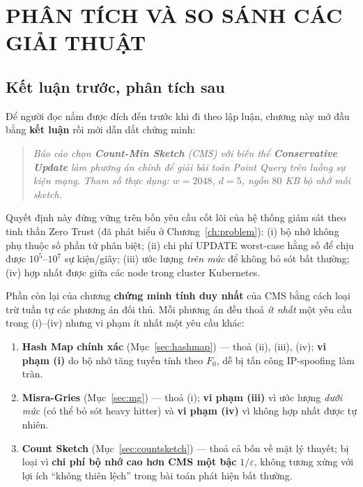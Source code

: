 
\chapter{PHÂN TÍCH VÀ SO SÁNH CÁC GIẢI THUẬT}
\label{ch:compare}

\section{Kết luận trước, phân tích sau}
\label{sec:cms-upfront}

Để người đọc nắm được đích đến trước khi đi theo lập luận, chương này mở đầu bằng \textbf{kết luận} rồi mới dẫn dắt chứng minh:

\begin{quote}
\textit{Báo cáo chọn \textbf{Count-Min Sketch} (CMS) với biến thể \textbf{Conservative Update} làm phương án chính để giải bài toán Point Query trên luồng sự kiện mạng. Tham số thực dụng: $w = 2048$, $d = 5$, ngốn $80$ KB bộ nhớ mỗi sketch.}
\end{quote}

Quyết định này đứng vững trên bốn yêu cầu cốt lõi của hệ thống giám sát theo tinh thần Zero Trust (đã phát biểu ở Chương~\ref{ch:problem}): (i) bộ nhớ không phụ thuộc số phần tử phân biệt; (ii) chi phí UPDATE worst-case hằng số để chịu được $10^5$--$10^7$ sự kiện/giây; (iii) ước lượng \textit{trên mức} để không bỏ sót bất thường; (iv) hợp nhất được giữa các node trong cluster Kubernetes.

Phần còn lại của chương \textbf{chứng minh tính duy nhất} của CMS bằng cách loại trừ tuần tự các phương án đối thủ. Mỗi phương án đều thoả \textit{ít nhất} một yêu cầu trong (i)--(iv) nhưng vi phạm ít nhất một yêu cầu khác:

\begin{enumerate}
  \item \textbf{Hash Map chính xác} (Mục~\ref{sec:hashmap}) --- thoả (ii), (iii), (iv); \textbf{vi phạm (i)} do bộ nhớ tăng tuyến tính theo $F_0$, dễ bị tấn công IP-spoofing làm tràn.
  \item \textbf{Misra-Gries} (Mục~\ref{sec:mg}) --- thoả (i); \textbf{vi phạm (iii)} vì ước lượng \textit{dưới mức} (có thể bỏ sót heavy hitter) và \textbf{vi phạm (iv)} vì không hợp nhất được tự nhiên.
  \item \textbf{Count Sketch} (Mục~\ref{sec:countsketch}) --- thoả cả bốn về mặt lý thuyết; bị loại vì \textbf{chi phí bộ nhớ cao hơn CMS một bậc} $1/\varepsilon$, không tương xứng với lợi ích ``không thiên lệch'' trong bài toán phát hiện bất thường.
\end{enumerate}

